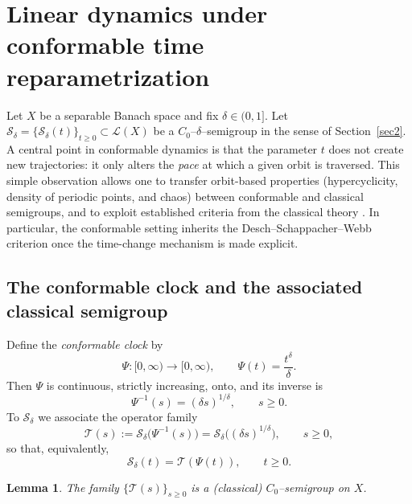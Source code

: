 \documentclass[preprint,12pt]{elsarticle}
\newtheorem{lemma}{Lemma}
\begin{document}
\section{Linear dynamics under conformable time reparametrization}\label{sec5}

Let $X$ be a separable Banach space and fix $\delta\in(0,1]$.
Let
\(
\mathcal S_\delta=\{\mathcal S_\delta(t)\}_{t\ge0}\subset\mathcal L(X)
\)
be a $C_0$--$\delta$--semigroup in the sense of Section~\ref{sec2}.
A central point in conformable dynamics is that the parameter $t$ does not create
new trajectories: it only alters the \emph{pace} at which a given orbit is
traversed.
This simple observation allows one to transfer orbit-based properties
(hypercyclicity, density of periodic points, and chaos) between conformable and
classical semigroups, and to exploit established criteria from the classical
theory \cite{desch1997,pazy1983,engel2000}.
In particular, the conformable setting inherits the Desch--Schappacher--Webb
criterion once the time-change mechanism is made explicit.

\subsection{The conformable clock and the associated classical semigroup}

Define the \emph{conformable clock} by
\[
\Psi:[0,\infty)\to[0,\infty),\qquad \Psi(t)=\frac{t^\delta}{\delta}.
\]
Then $\Psi$ is continuous, strictly increasing, onto, and its inverse is
\[
\Psi^{-1}(s)=(\delta s)^{1/\delta},\qquad s\ge0.
\]
To $\mathcal S_\delta$ we associate the operator family
\begin{equation}\label{eq:defT}
\mathcal T(s)
:=
\mathcal S_\delta\!\bigl(\Psi^{-1}(s)\bigr)
=
\mathcal S_\delta\!\bigl((\delta s)^{1/\delta}\bigr),
\qquad s\ge0,
\end{equation}
so that, equivalently,
\begin{equation}\label{eq:conjugacy_time}
\mathcal S_\delta(t)=\mathcal T(\Psi(t)),\qquad t\ge0.
\end{equation}

\begin{lemma}\label{lem:T_C0}
The family $\{\mathcal T(s)\}_{s\ge0}$ is a (classical) $C_0$--semigroup on $X$.
\end{lemma}
\end{document}
